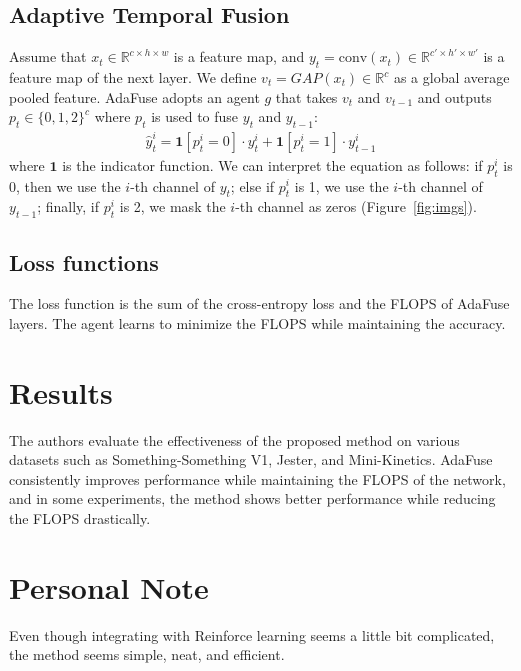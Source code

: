 \documentclass[10pt,twocolumn,letterpaper]{article}
\begin{document}
\subsection{Adaptive Temporal Fusion}
Assume that $x_t \in \mathbb{R}^{c \times h \times w}$ is a feature map, and $y_t=\text{conv}(x_t) \in \mathbb{R}^{c' \times h' \times w'}$ is a feature map of the next layer. We define $v_t = GAP(x_t) \in \mathbb{R}^{c}$ as a global average pooled feature. AdaFuse adopts an agent $g$ that takes $v_t$ and $v_{t-1}$ and outputs $p_t \in \{0, 1, 2\}^{c}$ where $p_t$ is used to fuse $y_t$ and $y_{t-1}$:
\begin{align*}
	\hat{y}^i_t = \mathbf{1}[p^i_t = 0] \cdot y^i_t + \mathbf{1}[p^i_t = 1] \cdot y^i_{t-1}
\end{align*}
where $\mathbf{1}$ is the indicator function. We can interpret the equation as follows: if $p^i_t$ is 0, then we use the $i$-th channel of $y_t$; else if $p^i_t$ is 1, we use the $i$-th channel of $y_{t-1}$; finally, if $p^i_t$ is 2, we mask the $i$-th channel as zeros (Figure~\ref{fig:imgs}). 

\subsection{Loss functions}
The loss function is the sum of the cross-entropy loss and the FLOPS of AdaFuse layers. The agent learns to minimize the FLOPS while maintaining the accuracy.

\section{Results}
The authors evaluate the effectiveness of the proposed method on various datasets such as Something-Something V1, Jester, and Mini-Kinetics. 
AdaFuse consistently improves performance while maintaining the FLOPS of the network, and in some experiments, the method shows better performance while reducing the FLOPS drastically. 

\section{Personal Note}
Even though integrating with Reinforce learning seems a little bit complicated, the method seems simple, neat, and efficient. 

% 
% 
\end{document}
